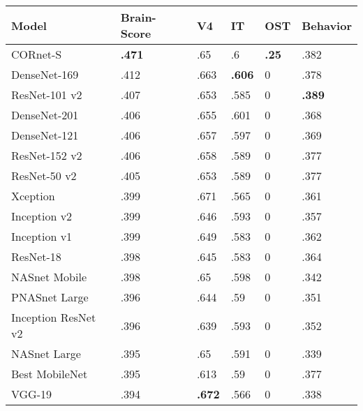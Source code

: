 \begin{tabular}{llllll}
\toprule
               Model &    Brain-Score &             V4 &             IT &           OST &       Behavior \\
\midrule
            CORnet-S &  \textbf{.471} &            .65 &             .6 &  \textbf{.25} &           .382 \\
        DenseNet-169 &           .412 &           .663 &  \textbf{.606} &             0 &           .378 \\
       ResNet-101 v2 &           .407 &           .653 &           .585 &             0 &  \textbf{.389} \\
        DenseNet-201 &           .406 &           .655 &           .601 &             0 &           .368 \\
        DenseNet-121 &           .406 &           .657 &           .597 &             0 &           .369 \\
       ResNet-152 v2 &           .406 &           .658 &           .589 &             0 &           .377 \\
        ResNet-50 v2 &           .405 &           .653 &           .589 &             0 &           .377 \\
            Xception &           .399 &           .671 &           .565 &             0 &           .361 \\
        Inception v2 &           .399 &           .646 &           .593 &             0 &           .357 \\
        Inception v1 &           .399 &           .649 &           .583 &             0 &           .362 \\
           ResNet-18 &           .398 &           .645 &           .583 &             0 &           .364 \\
       NASnet Mobile &           .398 &            .65 &           .598 &             0 &           .342 \\
       PNASnet Large &           .396 &           .644 &            .59 &             0 &           .351 \\
 Inception ResNet v2 &           .396 &           .639 &           .593 &             0 &           .352 \\
        NASnet Large &           .395 &            .65 &           .591 &             0 &           .339 \\
      Best MobileNet &           .395 &           .613 &            .59 &             0 &           .377 \\
              VGG-19 &           .394 &  \textbf{.672} &           .566 &             0 &           .338 \\

\end{tabular}
